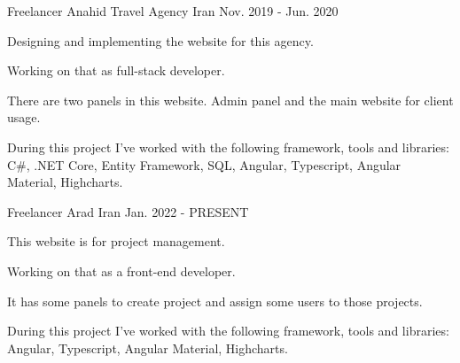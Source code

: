 

\begin{cventries}

  \cventry
    {Freelancer} %
    {Anahid Travel Agency} %
    {Iran} %
    {Nov. 2019 - Jun. 2020} %
    {
      \begin{cvitems} %
        \item {Designing and implementing the website for this agency.}
        \item {Working on that as full-stack developer.}
        \item {There are two panels in this website. Admin panel and the main website for client usage.}
        \item {During this project I've worked with the following framework, tools and libraries:  C\#, .NET Core, Entity Framework, SQL, Angular, Typescript, Angular Material, Highcharts.}
      \end{cvitems}
    }

  \cventry
    {Freelancer} %
    {Arad} %
    {Iran} %
    {Jan. 2022 - PRESENT} %
    {
      \begin{cvitems} %
        \item {This website is for project management.}
        \item {Working on that as a front-end developer.}
        \item {It has some panels to create project and assign some users to those projects.}
        \item {During this project I've worked with the following framework, tools and libraries:  Angular, Typescript, Angular Material, Highcharts.}
      \end{cvitems}
    }


\end{cventries}
